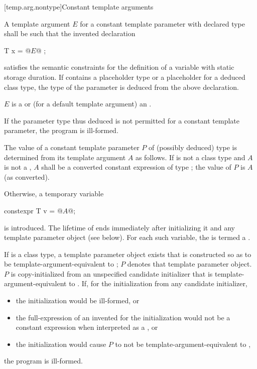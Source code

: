 [temp.arg.nontype]{Constant template arguments}

\pnum
A template argument $E$ for
a constant template parameter with declared type 
shall be such that the invented declaration
\begin{codeblock}
T x = @$E$@ ;
\end{codeblock}
satisfies the semantic constraints for the definition of
a  variable with static storage duration.
If  contains a placeholder type
or a placeholder for a deduced class type,
the type of the parameter is deduced from the above declaration.
\begin{note}
$E$ is a  or
(for a default template argument) an .
\end{note}
If the parameter type thus deduced is not permitted
for a constant template parameter,
the program is ill-formed.

\pnum
The value of a constant template parameter $P$
of (possibly deduced) type 
is determined from its template argument $A$ as follows.
If  is not a class type and
$A$ is not a ,
$A$ shall be a converted constant expression
of type ; the value of $P$ is $A$ (as converted).

\pnum
Otherwise, a temporary variable
\begin{codeblock}
constexpr T v = @$A$@;
\end{codeblock}
is introduced.
The lifetime of  ends immediately after initializing it and
any template parameter object (see below).
For each such variable,
the  
is termed a .

\pnum
If  is a class type,
a template parameter object exists
that is constructed so as to be template-argument-equivalent to ;
$P$ denotes that template parameter object.
$P$ is copy-initialized from an unspecified candidate initializer
that is template-argument-equivalent to .
If, for the initialization from any candidate initializer,
\begin{itemize}
\item
the initialization would be ill-formed, or
\item
the full-expression of an invented 
for the initialization would not be a constant expression
when interpreted as a , or
\item
the initialization would cause $P$ to not be template-argument-equivalent to ,
\end{itemize}
the program is ill-formed.

